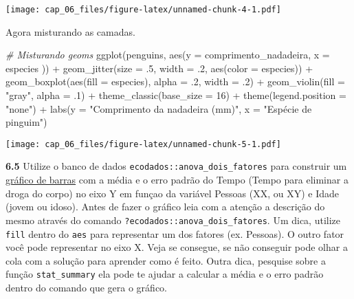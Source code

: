 \documentclass[
]{book}
\newenvironment{Shaded}{\begin{snugshade}}{\end{snugshade}}
\newcommand{\AttributeTok}[1]{\textcolor[rgb]{0.77,0.63,0.00}{#1}}
\newcommand{\CommentTok}[1]{\textcolor[rgb]{0.56,0.35,0.01}{\textit{#1}}}
\newcommand{\DecValTok}[1]{\textcolor[rgb]{0.00,0.00,0.81}{#1}}
\newcommand{\FunctionTok}[1]{\textcolor[rgb]{0.00,0.00,0.00}{#1}}
\newcommand{\NormalTok}[1]{#1}
\newcommand{\SpecialCharTok}[1]{\textcolor[rgb]{0.00,0.00,0.00}{#1}}
\newcommand{\StringTok}[1]{\textcolor[rgb]{0.31,0.60,0.02}{#1}}
\begin{document}
\texttt{[image: cap\_06\_files/figure-latex/unnamed-chunk-4-1.pdf]}

Agora misturando as camadas.

\begin{Shaded}
\begin{Highlighting}[]
\CommentTok{\# Misturando geoms}
\FunctionTok{ggplot}\NormalTok{(penguins, }\FunctionTok{aes}\NormalTok{(}\AttributeTok{y =}\NormalTok{ comprimento\_nadadeira, }\AttributeTok{x =}\NormalTok{ especies )) }\SpecialCharTok{+}
  \FunctionTok{geom\_jitter}\NormalTok{(}\AttributeTok{size =}\NormalTok{ .}\DecValTok{5}\NormalTok{, }\AttributeTok{width =}\NormalTok{ .}\DecValTok{2}\NormalTok{, }\FunctionTok{aes}\NormalTok{(}\AttributeTok{color =}\NormalTok{ especies)) }\SpecialCharTok{+}
  \FunctionTok{geom\_boxplot}\NormalTok{(}\FunctionTok{aes}\NormalTok{(}\AttributeTok{fill =}\NormalTok{ especies), }\AttributeTok{alpha =}\NormalTok{ .}\DecValTok{2}\NormalTok{, }\AttributeTok{width =}\NormalTok{ .}\DecValTok{2}\NormalTok{) }\SpecialCharTok{+}
  \FunctionTok{geom\_violin}\NormalTok{(}\AttributeTok{fill =} \StringTok{"gray"}\NormalTok{, }\AttributeTok{alpha =}\NormalTok{ .}\DecValTok{1}\NormalTok{) }\SpecialCharTok{+}
  \FunctionTok{theme\_classic}\NormalTok{(}\AttributeTok{base\_size =} \DecValTok{16}\NormalTok{) }\SpecialCharTok{+}
  \FunctionTok{theme}\NormalTok{(}\AttributeTok{legend.position =} \StringTok{"none"}\NormalTok{) }\SpecialCharTok{+}
  \FunctionTok{labs}\NormalTok{(}\AttributeTok{y =} \StringTok{"Comprimento da nadadeira (mm)"}\NormalTok{,}
       \AttributeTok{x =} \StringTok{"Espécie de pinguim"}\NormalTok{)}
\end{Highlighting}
\end{Shaded}

\texttt{[image: cap\_06\_files/figure-latex/unnamed-chunk-5-1.pdf]}

\textbf{6.5}
Utilize o banco de dados \texttt{ecodados::anova\_dois\_fatores} para construir um \href{https://analises-ecologicas.netlify.app/cap6.html\#gr\%C3\%A1fico-de-barras-bar-plot}{gráfico de barras} com a média e o erro padrão do Tempo (Tempo para eliminar a droga do corpo) no eixo Y em funçao da variável Pessoas (XX, ou XY) e Idade (jovem ou idoso). Antes de fazer o gráfico leia com a atenção a descrição do mesmo através do comando \texttt{?ecodados::anova\_dois\_fatores}. Um dica, utilize \texttt{fill} dentro do \texttt{aes} para representar um dos fatores (ex. Pessoas). O outro fator você pode representar no eixo X. Veja se consegue, se não conseguir pode olhar a cola com a solução para aprender como é feito. Outra dica, pesquise sobre a função \texttt{stat\_summary} ela pode te ajudar a calcular a média e o erro padrão dentro do comando que gera o gráfico.
\end{document}
